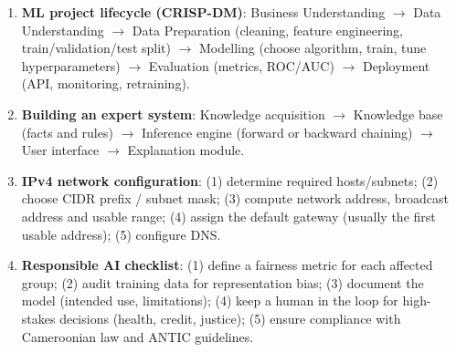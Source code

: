 \documentclass[11pt]{article}
\begin{document}
\begin{methode}
\begin{enumerate}
    \item \textbf{ML project lifecycle (CRISP-DM)}: Business Understanding $\to$ Data Understanding $\to$ Data Preparation (cleaning, feature engineering, train/validation/test split) $\to$ Modelling (choose algorithm, train, tune hyperparameters) $\to$ Evaluation (metrics, ROC/AUC) $\to$ Deployment (API, monitoring, retraining).
    \item \textbf{Building an expert system}: Knowledge acquisition $\to$ Knowledge base (facts and rules) $\to$ Inference engine (forward or backward chaining) $\to$ User interface $\to$ Explanation module.
    \item \textbf{IPv4 network configuration}: (1) determine required hosts/subnets; (2) choose CIDR prefix / subnet mask; (3) compute network address, broadcast address and usable range; (4) assign the default gateway (usually the first usable address); (5) configure DNS.
    \item \textbf{Responsible AI checklist}: (1) define a fairness metric for each affected group; (2) audit training data for representation bias; (3) document the model (intended use, limitations); (4) keep a human in the loop for high-stakes decisions (health, credit, justice); (5) ensure compliance with Cameroonian law and ANTIC guidelines.
\end{enumerate}
\end{methode}
\end{document}
